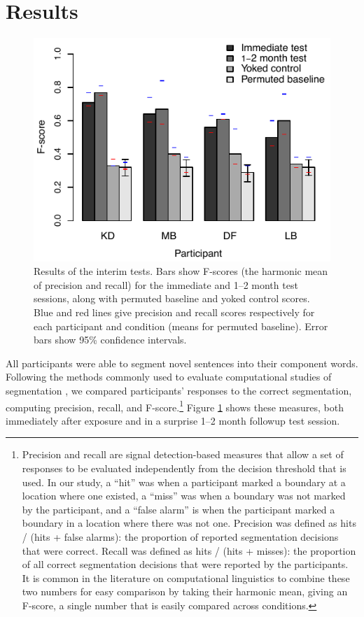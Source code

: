 \documentclass[10pt]{article}
\begin{document}
\section*{Results}


\begin{figure}[t]
\begin{center}
\includegraphics{figures/interim_test_col.pdf}
\caption{\label{fig:interim} Results of the interim tests. Bars show F-scores (the harmonic mean of precision and recall) for the immediate and 1--2 month test sessions, along with permuted baseline and yoked control scores. Blue and red lines give precision and recall scores respectively for each participant and condition (means for permuted baseline). Error bars show 95\% confidence intervals.}
\end{center}
\end{figure}

All participants were able to segment novel sentences into their component words.  Following the methods commonly used to evaluate computational studies of segmentation \cite{brent1999b,goldwater2009}, we compared participants' responses to the correct segmentation, computing precision, recall, and F-score.\footnote{Precision and recall are signal detection-based measures that allow a set of responses to be evaluated independently from the decision threshold that is used. In our study, a ``hit'' was when a participant marked a boundary at a location where one existed, a ``miss'' was when a boundary was not marked by the participant, and a ``false alarm'' is when the participant marked a boundary in a location where there was not one. Precision was defined as hits / (hits + false alarms): the proportion of reported segmentation decisions that were correct. Recall was defined as hits / (hits + misses): the proportion of all correct segmentation decisions that were reported by the participants. It is common in the literature on computational linguistics to combine these two numbers for easy comparison by taking their harmonic mean, giving an F-score, a single number that is easily compared across conditions.} Figure \ref{fig:interim} shows these measures, both immediately after exposure and in a surprise 1--2 month followup test session. 
\end{document}
